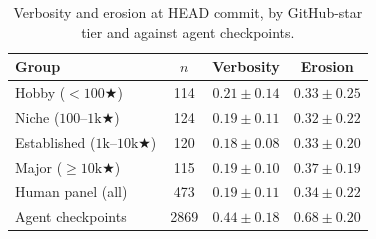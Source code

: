 \begin{table}[t]
    \centering
    \caption{Verbosity and erosion at HEAD commit, by GitHub-star tier and against agent checkpoints.}
    \label{tab:agent-vs-human}
    \footnotesize
    \setlength{\tabcolsep}{6pt}
    \begin{tabular}{lccc}
        \toprule
        Group & $n$ & Verbosity & Erosion \\
        \midrule
        Hobby ($< 100\bigstar$) & 114 & $0.21 \pm 0.14$ & $0.33 \pm 0.25$ \\
        Niche ($100\text{--}1\text{k}\bigstar$) & 124 & $0.19 \pm 0.11$ & $0.32 \pm 0.22$ \\
        Established ($1\text{k}\text{--}10\text{k}\bigstar$) & 120 & $0.18 \pm 0.08$ & $0.33 \pm 0.20$ \\
        Major ($\geq 10\text{k}\bigstar$) & 115 & $0.19 \pm 0.10$ & $0.37 \pm 0.19$ \\
        \midrule
        Human panel (all) & 473 & $0.19 \pm 0.11$ & $0.34 \pm 0.22$ \\
        Agent checkpoints & 2869 & $0.44 \pm 0.18$ & $0.68 \pm 0.20$ \\
        \bottomrule
    \end{tabular}
\end{table}
